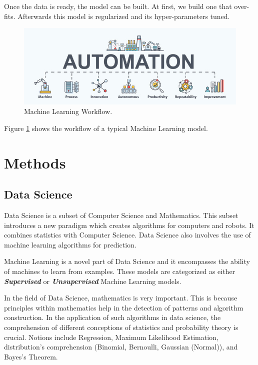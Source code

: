 \documentclass[
]{thesis-ekf}
\begin{document}
Once the data is ready, the model can be built. At first, we build one that over-fits. Afterwards this model is regularized and its hyper-parameters tuned. 

\begin{figure}[h!]
	\includegraphics[width=\textwidth,height=\textheight,keepaspectratio]{fig/workflow.png}
	\caption{Machine Learning Workflow.}
	\label{fig:workflow}
\end{figure}

Figure \ref{fig:workflow} shows the workflow of a typical Machine Learning model.



\chapter{Methods}
\section{Data Science}
Data Science is a subset of Computer Science and Mathematics. This subset introduces a new paradigm which creates algorithms for computers and robots. It combines statistics with Computer Science. Data Science also involves the use of machine learning algorithms for prediction.

Machine Learning is a novel part of Data Science and it encompasses the ability of machines to learn from examples. These models are categorized as either \textbf{\textit{Supervised}} or \textbf{\textit{Unsupervised}} Machine Learning models. 

In the field of Data Science, mathematics is very important. This is because principles within mathematics help in the detection of patterns and algorithm construction. In the application of such algorithms in data science, the comprehension of different conceptions of statistics and probability theory is crucial. Notions include Regression, Maximum Likelihood Estimation, distribution's comprehension (Binomial, Bernoulli, Gaussian (Normal)), and Bayes's Theorem.
\end{document}
